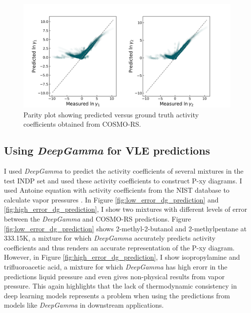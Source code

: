 \begin{figure}
    \centering
    \includegraphics[width=\textwidth]{gfx/Chapter07/DG_test_indp_parity_plot.png}
    \caption{Parity plot showing predicted versus ground truth activity coefficients obtained from COSMO-RS.}
    \label{fig:dg_test_indp_parity_plot}
\end{figure}

\subsection{Using \textit{DeepGamma} for VLE predictions}

I used \textit{DeepGamma} to predict the activity coefficients of several mixtures in the test INDP set and used these activity coefficients to construct P-xy diagrams. I used Antoine equation with activity coefficients from the NIST database to calculate vapor pressures \cite{Muzny}. In Figure \ref{fig:low_error_dg_prediction} and \ref{fig:high_error_dg_prediction}, I show two mixtures with different levels of error  between the \textit{DeepGamma} and COSMO-RS predictions. Figure \ref{fig:low_error_dg_prediction} shows 2-methyl-2-butanol and 2-methylpentane at 333.15K, a mixture for which \textit{DeepGamma} accurately predicts activity coefficients and thus renders an accurate representation of the P-xy diagram.  However, in Figure \ref{fig:high_error_dg_prediction}, I show isopropylamine and trifluoroacetic acid, a mixture for which \textit{DeepGamma} has high erorr in the predictions liquid pressure and even gives non-physical results from vapor pressure. This again highlights that the lack of thermodynamic consistency in deep learning models represents a problem when using the predictions from models like \textit{DeepGamma} in downstream applications.

